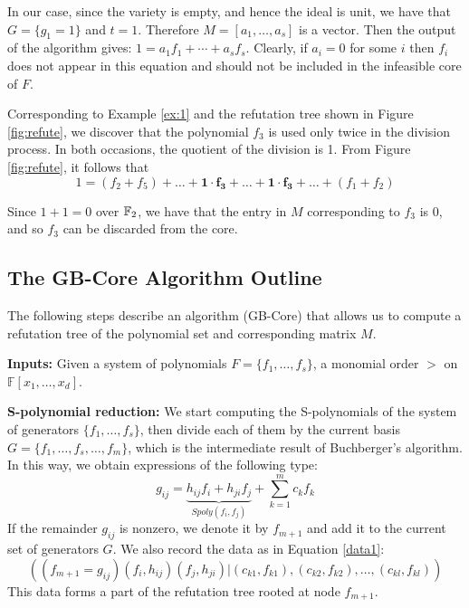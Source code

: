 \begin{Proof}
In our case, since the variety is empty, and hence the ideal is
unit, we have that $G = \{g_1=1\}$ and $t=1$. Therefore $M=
[a_1, \ldots, a_s]$ is a vector. Then the output of the algorithm
gives: $1 = a_1f_1+\cdots + a_s f_s.$ Clearly, if $a_i=0$ for some $i$ then
$f_i$ does not appear in this equation and should not be included in
the infeasible core of $F$. 

\end{Proof}


\begin{Example}

Corresponding to Example \ref{ex:1} and the refutation tree shown in
Figure \ref{fig:refute}, we discover that the polynomial $f_3$ is used
only twice in the division process. In both occasions, the quotient of
the division is 1. From Figure \ref{fig:refute}, it follows that
\begin{equation}
1 = (f_2 + f_5) + \dots + \mathbf{1\cdot f_3} + \dots + \mathbf{1\cdot
  f_3}+ \dots + (f_1 + f_2)
\end{equation}

Since $1 + 1 = 0$ over ${\mathbb{F}}_2$, we have that the entry in $M$
corresponding to $f_3$ is 0, and so $f_3$ can be discarded from the
core. 
\end{Example}

\subsection{The GB-Core Algorithm Outline}

The following steps describe an algorithm (GB-Core) that allows us to compute a
refutation tree of the polynomial set and corresponding matrix $M$. 

{\bf Inputs:} Given a system of polynomials $F=\{f_1,\ldots,f_s\}$, a
monomial order $>$ on $\mathbb{F}[x_1,\ldots,x_d]$.  

{\bf S-polynomial reduction:} We start computing the S-polynomials of the system of
generators $\{f_1,\ldots,f_s\}$, then divide each of them by the
current basis $G=\{f_1,\dots,f_s,\dots,f_m\}$, which is the
intermediate result of Buchberger's algorithm.  
In this way, we obtain expressions of the following type:
\begin{equation}
\label{eqn:red}
g_{ij}= \underbrace{h_{ij}f_{i}+h_{ji}f_{j}}_{Spoly(f_i,f_j)}+\displaystyle\sum_{k=1}^m c_kf_k
\end{equation}
If the remainder $g_{ij}$ is nonzero, we denote it by
$f_{m+1}$ and add it to the current set of generators $G$. We
also record the data as in Equation \ref{data1}: 
\begin{displaymath}
((f_{m+1}=g_{ij})(f_{i},h_{ij})(f_{j},h_{ji})| (c_{k1},f_{k1}),(c_{k2},f_{k2}),\dots,(c_{kl},f_{kl}))
\end{displaymath}
This data forms a part of the refutation tree rooted at node $f_{m+1}$.

